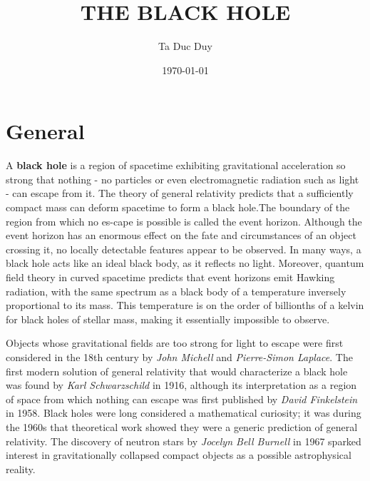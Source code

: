 \documentclass[twocolumn,12pt]{article}
\title{\textbf{THE BLACK HOLE}}
\author{Ta Duc Duy }
\date{\today}
\begin{document}
\begin{titlepage}
	\maketitle
	\pagecolor{black!10} 
\end{titlepage}



\tableofcontents

\section{General}
A \textbf{black hole} is a region of spacetime exhibiting gravitational acceleration so strong that nothing - no particles or even electromagnetic radiation such as light - can escape from it. The theory of general relativity predicts that a sufficiently compact mass can deform spacetime to form a black hole.The boundary of the region from which no es-cape is possible is called the event horizon. Although the event horizon has an enormous effect on the fate and circumstances of an object crossing it, no locally detectable features appear to be observed. In many ways, a black hole acts like an ideal black body, as it reflects no light. Moreover, quantum field theory in curved spacetime predicts that event horizons emit Hawking radiation, with the same spectrum as a black body of a temperature inversely proportional to its mass. This temperature is on the order of billionths of a kelvin for black holes of stellar mass, making it essentially impossible to observe. 

Objects whose gravitational fields are too strong for light to escape were first considered in the 18th century by \textit{John Michell} and \textit{Pierre-Simon Laplace}. The first modern solution of general relativity that would characterize a black hole was found by \textit{Karl Schwarzschild} in 1916, although its interpretation as a region of space from which nothing can escape was first published by \textit{David Finkelstein} in 1958. Black holes were long considered a mathematical curiosity; it was during the 1960s that theoretical work showed they were a generic prediction of general relativity. The discovery of neutron stars by \textit{Jocelyn Bell Burnell} in 1967 sparked interest in gravitationally collapsed compact objects as a possible astrophysical reality.\\ 
\end{document}
